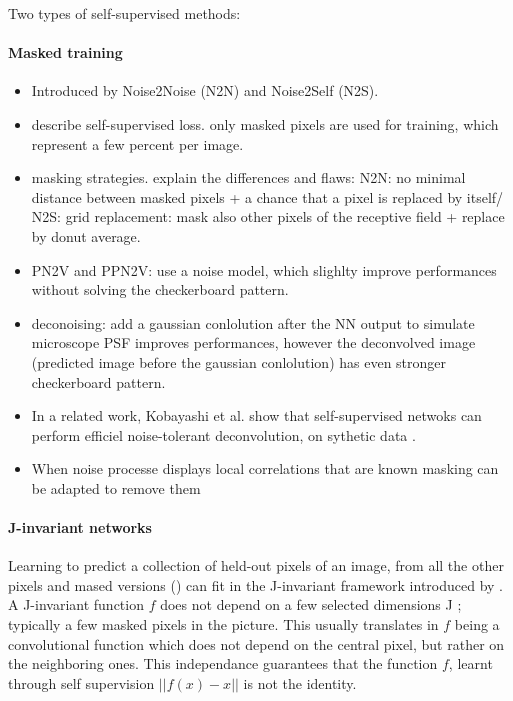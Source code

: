\documentclass{article}
\begin{document}
Two types of self-supervised methods:
\paragraph{Masked training}
\begin{itemize}
\item Introduced by Noise2Noise\cite{krull2018noise2void} (N2N) and Noise2Self \cite{batson2019noise2self} (N2S).
\item describe self-supervised loss. only masked pixels are used for training, which represent a few percent per image.
\item masking strategies. explain the differences and flaws: N2N: no minimal distance between masked pixels + a chance that a pixel is replaced by itself/ N2S: grid replacement: mask also other pixels of the receptive field + replace by donut average.
\item PN2V\cite{krull2019probabilistic} and PPN2V\cite{prakash2020fully}: use a noise model, which slighlty improve performances without solving the checkerboard pattern.
\item deconoising:\cite{goncharova2020} add a gaussian conlolution after the NN output to simulate microscope PSF improves performances, however the deconvolved image (predicted image before the gaussian conlolution) has even stronger checkerboard pattern.
\item In a related work, Kobayashi et al. show that self-supervised netwoks can perform efficiel noise-tolerant deconvolution, on sythetic data \cite{kobayashi2020image}.
\item When noise processe displays local correlations that are known masking can be adapted to remove them \cite{broaddus2020removing}
\end{itemize}

\paragraph{J-invariant networks}
Learning to predict a collection of held-out pixels of an image, from all the other pixels and mased versions (\cite{krull2018noise2void}) can fit in the
J-invariant framework introduced by \cite{batson2019noise2self}. A J-invariant function $f$ does not depend on a few selected dimensions J ; typically a few masked pixels
in the picture. This usually translates in $f$ being a convolutional function which does not depend on the central pixel, but rather on the neighboring ones. This independance guarantees that the function $f$, learnt through self supervision $||f(x) - x||$ is not the identity.
\end{document}

